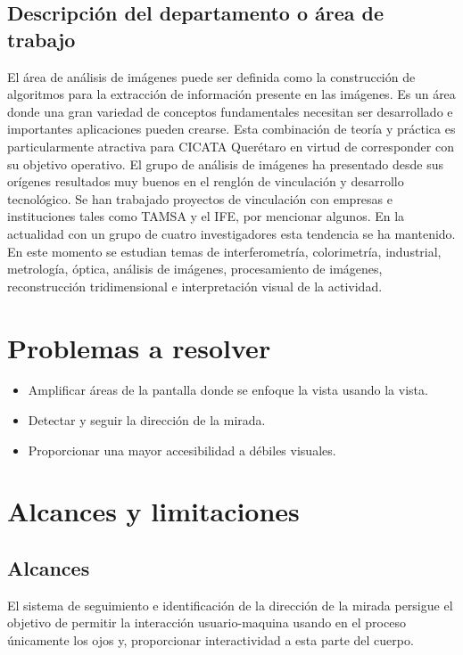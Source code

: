 \documentclass[12pt]{book} %
\begin{document}
	
	\subsection{Descripción del departamento o área de trabajo}
		 El área de análisis de imágenes puede ser definida como la construcción de algoritmos para la extracción de 
		 información presente en las imágenes. Es un área donde una gran variedad de conceptos fundamentales necesitan 
		 ser desarrollado e importantes aplicaciones pueden crearse. Esta combinación de teoría y práctica es particularmente 
		 atractiva para CICATA Querétaro en virtud de corresponder con su objetivo operativo. El grupo de análisis de imágenes 
		 ha presentado desde sus orígenes resultados muy buenos en el renglón de vinculación y desarrollo tecnológico.  
		 Se han trabajado proyectos de vinculación con empresas e instituciones tales como TAMSA y el IFE, por mencionar algunos. 
		 En la actualidad con un grupo de cuatro investigadores esta tendencia se ha mantenido.  En este momento se estudian 
		 temas de interferometría, colorimetría, industrial, metrología, óptica, análisis de imágenes, procesamiento de imágenes, 
		 reconstrucción tridimensional e interpretación visual de la actividad.

\newpage
\section{Problemas a resolver}
	\begin{itemize}
		\item Amplificar áreas de la pantalla donde se enfoque la vista usando la vista.
		\item Detectar y seguir la dirección de la mirada.
		\item Proporcionar una mayor accesibilidad a débiles visuales.
	\end{itemize}
\newpage
\section{Alcances y limitaciones}
	\subsection{Alcances}
		El sistema de seguimiento e identificación de la dirección de la mirada persigue el objetivo de permitir la interacción 
		usuario-maquina usando en el proceso únicamente los ojos y, proporcionar interactividad a esta parte del cuerpo.\\
		
\end{document}
